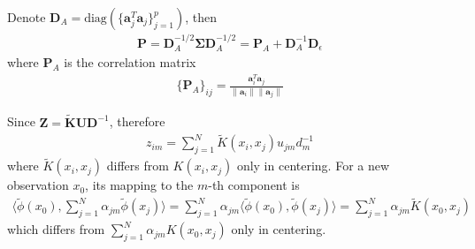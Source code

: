 \begin{exercise}[(Program)]
\end{exercise}

\begin{exercise}
  Denote $\mathbf{D}_A=\mbox{diag}(\{\mathbf{a}_j^T\mathbf{a}_j\}_{j=1}^p)$,
  then
  \begin{align}
    \mathbf{P} = \mathbf{D}_A^{-1/2} \mathbf{\Sigma} \mathbf{D}_A^{-1/2} =
    \mathbf{P}_A + \mathbf{D}_A^{-1}\mathbf{D}_{\epsilon}
  \end{align}
  where $\mathbf{P}_A $ is the correlation matrix
  \begin{align}
    \{\mathbf{P}_A\}_{ij} = \frac{\mathbf{a}_i^T\mathbf{a}_j}
    {\|\mathbf{a}_i\|\|\mathbf{a}_j\|}
  \end{align}
\end{exercise}

\begin{exercise}[(Program)]
\end{exercise}

\begin{exercise}
  Since $\mathbf{Z} = \tilde{\mathbf{K}}\mathbf{UD}^{-1}$, therefore
  \begin{align}
    z_{im} = \sum_{j=1}^N\tilde{K}(x_i, x_j)u_{jm}d_m^{-1}
  \end{align}
  where $\tilde{K}(x_i, x_j)$ differs from $K(x_i, x_j)$ only in centering. For
  a new observation $x_0$, its mapping to the $m$-th component is 
  \begin{align}
    \langle\tilde{\phi}(x_0), \sum_{j = 1}^N\alpha_{jm}\tilde{\phi}(x_j)\rangle =
    \sum_{j = 1}^N\alpha_{jm}\langle\tilde{\phi}(x_0), \tilde{\phi}(x_j)\rangle
    = \sum_{j=1}^N \alpha_{jm} \tilde{K}(x_0, x_j)
  \end{align}
  which differs from $\sum_{j=1}^N \alpha_{jm} K(x_0, x_j)$ only in centering.
  
\end{exercise}

